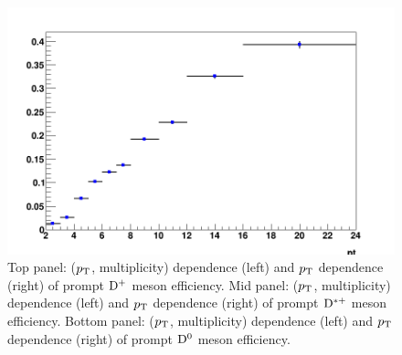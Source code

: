 \begin{figure}[!htp]
	\includegraphics[width=.48\linewidth]{figures/Effs/EfficiencyMap_1D_Dzero_c_Ref_wLimAcc_Plot.png}  %
	
\caption{Top panel: ($p_{\rm T}$, multiplicity) dependence (left) and $p_{\rm T}$  dependence (right) of prompt ${\rm D^+}$ meson efficiency.
Mid panel: ($p_{\rm T}$, multiplicity) dependence (left) and $p_{\rm T}$  dependence (right) of prompt ${\rm D^{*+}}$ meson efficiency.
Bottom panel: ($p_{\rm T}$, multiplicity) dependence (left) and $p_{\rm T}$  dependence (right) of prompt ${\rm D^0}$ meson efficiency.
}
	\label{fig:dEffPrompt}	
\end{figure}

